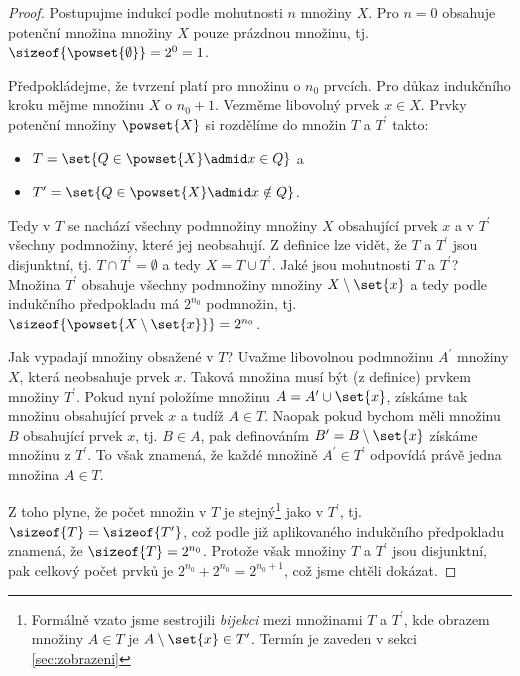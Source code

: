 \begin{proof}
    Postupujme indukcí podle mohutnosti $n$ množiny $X$. Pro $n=0$ obsahuje potenční množina množiny $X$ pouze prázdnou množinu, tj. $\sizeof{\powset{\emptyset}}=2^0=1$.\par
    Předpokládejme, že tvrzení platí pro množinu o $n_0$ prvcích. Pro důkaz indukčního kroku mějme množinu $X$ o $n_0+1$. Vezměme libovolný prvek $x \in X$. Prvky potenční množiny $\powset{X}$ si rozdělíme do množin $T$ a $T^\prime$ takto:
    \begin{itemize}
        \item $T=\set{Q \in \powset{X} \admid x\in Q}$ a
        \item $T^\prime=\set{Q \in \powset{X} \admid x\notin Q}$.
    \end{itemize}
    Tedy v $T$ se nachází všechny podmnožiny množiny $X$ obsahující prvek $x$ a v $T^\prime$ všechny podmnožiny, které jej neobsahují. Z definice lze vidět, že $T$ a $T^\prime$ jsou disjunktní, tj. $T \cap T^\prime=\emptyset$ a tedy $X=T\cup T^\prime$. Jaké jsou mohutnosti $T$ a $T^\prime$? Množina $T^\prime$ obsahuje všechny podmnožiny množiny $X\setminus\set{x}$ a tedy podle indukčního předpokladu má $2^{n_0}$ podmnožin, tj. $\sizeof{\powset{X\setminus\set{x}}}=2^{n_0}$.\par
    Jak vypadají množiny obsažené v $T$? Uvažme libovolnou podmnožinu $A^\prime$ množiny $X$, která neobsahuje prvek $x$. Taková množina musí být (z definice) prvkem množiny $T^\prime$. Pokud nyní položíme množinu $A=A^\prime\cup \set{x}$, získáme tak množinu obsahující prvek $x$ a tudíž $A\in T$. Naopak pokud bychom měli množinu $B$ obsahující prvek $x$, tj. $B\in A$, pak definováním $B^\prime=B\setminus \set{x}$ získáme množinu z $T^\prime$. To však znamená, že každé množině $A^\prime\in T^\prime$ odpovídá právě jedna množina $A\in T$.\par
    Z toho plyne, že počet množin v $T$ je stejný\footnote{Formálně vzato jsme sestrojili \emph{bijekci} mezi množinami $T$ a $T^\prime$, kde obrazem množiny $A\in T$ je $A\setminus \set{x}\in T^\prime$. Termín je zaveden v sekci \ref{sec:zobrazeni}} jako v $T^\prime$, tj. $\sizeof{T}=\sizeof{T^\prime}$, což podle již aplikovaného indukčního předpokladu znamená, že $\sizeof{T}=2^{n_0}$. Protože však množiny $T$ a $T^\prime$ jsou disjunktní, pak celkový počet prvků je $2^{n_0}+2^{n_0}=2^{n_0+1}$, což jsme chtěli dokázat.
\end{proof}

